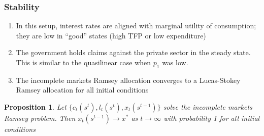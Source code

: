 \documentclass{beamer}
\newcommand{\EE}{\mathbb E}
\newtheorem{proposition}{Proposition}
\begin{document}
%
%
%
\begin{frame}
	\frametitle{Stability}
	\begin{enumerate}
	 \item In this setup, interest rates are aligned with marginal utility of consumption;  they are low  in ``good'' states (high TFP or low expenditure)
	 \item The government holds claims against the private sector in the steady state. This is similar to the quasilinear case when $p_1$ was low.	 
	 \item The incomplete markets Ramsey allocation converges to a Lucas-Stokey  Ramsey allocation for all initial conditions	 	
	\end{enumerate}


	\begin{proposition}  Let $\{c_t(s^t), l_t(s^t), x_t(s^{t-1})\}$ solve the incomplete markets Ramsey problem.  Then  $x_t(s^{t-1})\rightarrow x^*$ as $t\rightarrow \infty$ with probability 1 for all initial conditions
	
	\end{proposition}
	\end{frame}
	
\end{document}
